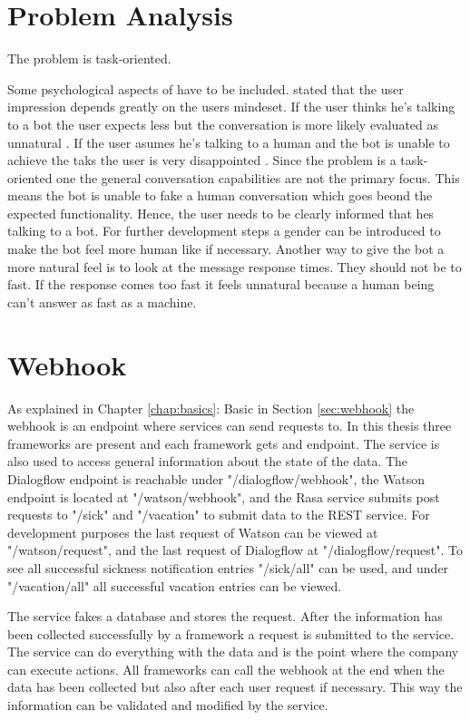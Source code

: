 \section{Problem Analysis}
The problem is task-oriented.

Some psychological aspects of \citet{brandtzaeg2018chatbots} have to be included.
\citet{brandtzaeg2018chatbots} stated that the user impression depends greatly on the users mindeset.
If the user thinks he's talking to a bot the user expects less but the conversation is more likely 
evaluated as unnatural \cite{brandtzaeg2018chatbots}. If the user asumes he's talking to a human 
and the bot is unable to achieve the taks the user is very disappointed \cite{brandtzaeg2018chatbots}.
Since the problem is a task-oriented one the general conversation capabilities are not the primary focus.
This means the bot is unable to fake a human conversation which goes beond the expected functionality.
Hence, the user needs to be clearly informed that hes talking to a bot.
For further development steps a gender can be introduced to make the bot feel more human like if necessary.
Another way to give the bot a more natural feel is to look at the message response times.
They should not be to fast.
If the response comes too fast it feels unnatural because a human being can't answer as fast as a machine.

\section{Webhook}
As explained in Chapter \ref{chap:basics}: Basic in Section \ref{sec:webhook} 
the webhook is an endpoint where services can send requests to.
In this thesis three frameworks are present and each framework gets and endpoint.
The service is also used to access general information about the state of the data.
The Dialogflow endpoint is reachable under "/dialogflow/webhook",
the Watson endpoint is located at "/watson/webhook",
and the Rasa service submits post requests to "/sick" and "/vacation" to submit data 
to the REST service.
For development purposes the last request of Watson can be viewed at "/watson/request",
and the last request of Dialogflow at "/dialogflow/request".
To see all successful sickness notification entries "/sick/all" can be used,
and under "/vacation/all" all successful vacation entries can be viewed.

The service fakes a database and stores the request.
After the information has been collected successfully by a framework a 
request is submitted to the service.
The service can do everything with the data and is the point where the company can execute actions.
All frameworks can call the webhook at the end when the data has been collected but also 
after each user request if necessary.
This way the information can be validated and modified by the service.



